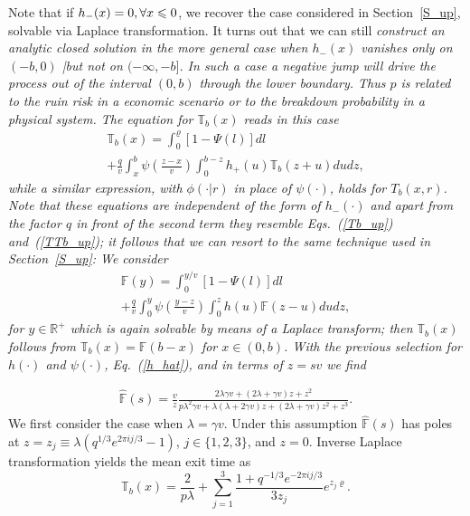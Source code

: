 \documentclass[english,aps,a4paper,twocolumn,showpacs,showkeys,amsfonts,amsmath,amssymb,amscd,nofootinbib]{revtex4}
\newcommand{\1}{\'\i}
\newcommand{\TT}{\mathbb{T}}\newcommand{\FF}{\mathbb{F}}
\newcommand{\RR}{\mathbb{R}}
\begin{document}
Note that if $h_-(x)=0, \forall x\leqslant 0$, we recover the case considered
in Section~\ref{S_up}, solvable  via Laplace
    transformation. It turns out that we can still \it construct an
analytic closed solution \rm in
    the more general case when $h_-(x)  $  vanishes \it only \rm on $(-b,0)$ |but not on
    $(-\infty,-b]$.
     In such
a case a negative jump will  drive  the process out of the
interval $(0,b)$ through the lower boundary. Thus  $p$ is related
to    the ruin risk in a economic scenario or to  the breakdown
probability in a physical system.
 The  equation  for
 $\TT_b(x)$ reads in this case
\begin{eqnarray}
\TT_b(x)= \int^{\varrho}_{0}\left[1-\Psi\left(l\right)\right]d
l \nonumber\\+ \frac{q}{v}\int^{b}_{x} \psi\left(\frac{z-x}{v}\right)
\int^{b-z}_{0} h_+(u) \TT_b\left(z+u\right)d  ud  z,
\label{TTb_ruin}
\end{eqnarray}
while a similar expression, with $\phi(\cdot|r)$ in place of $\psi(\cdot)$, holds for $T_b(x,r)$.
Note that these equations are independent of the form of $h_-(\cdot)$
and  apart from the factor $q$ in front of the second term they
resemble Eqs.~(\ref{Tb_up}) and~(\ref{TTb_up}); it follows that
we can resort to the same technique used in Section~\ref{S_up}:
We consider
\begin{eqnarray}
\FF(y)= \int^{y/v}_{0}\left[1-\Psi(l)\right]d  l  \nonumber \\+
\frac{q}{v}\int^{y}_{0} \psi\left(\frac{y-z}{v}\right)
\int^{z}_{0} h(u) \FF\left(z-u\right)d  ud  z, %
\end{eqnarray}
for $y\in \RR^{+}$ which is again solvable  by means of a Laplace
transform; then $\TT_b(x)$ follows from  $\TT_b(x) =\FF(b-x)$  for
$x\in (0,b)$. With the previous selection for $h(\cdot)$ and
$\psi(\cdot)$, Eq.~(\ref{h_hat}), and in terms of    $z=sv $ %
we find

    \begin{eqnarray}
\hat{\FF}(s)=\frac{v}{z} \frac{2\lambda \gamma v  +  (2 \lambda+\gamma v ) z +  z^2}{p \lambda^2 \gamma v   + \lambda  (\lambda +2\gamma v  )  z+   (2 \lambda +\gamma v  )  z^2+z^3  }.\label{FF}
\end{eqnarray}
We first consider the case when   $\lambda
  =\gamma v$. Under this assumption  $\hat{\FF}(s)$ has poles at
$z=z_j\equiv \lambda \left(q^{1/3} e^{2\pi ij/3}-1\right)$, $j\in\{1,2,3\}$, and  $z=0$.
Inverse Laplace transformation yields the mean exit time as
\begin{equation}
\TT_b(x)=  \frac{2}{ p\lambda}+ \sum_{j=1}^3 \frac{ 1+q^{-1/3} e^{-2\pi ij/3}}{ 3 z_j} e^{z_j\varrho}.
 \end{equation}
\end{document}
